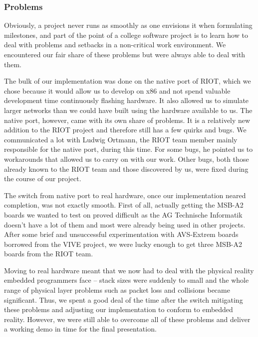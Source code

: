\documentclass[11pt,
  a4paper,
  ngerman,
  BCOR=7mm
]{scrartcl}
\begin{document}
\subsubsection*{Problems}
\label{ssub:problems}
Obviously, a project never runs as smoothly as one envisions it when
formulating milestones, and part of the point of a college software
project is to learn how to deal with problems and setbacks in
a non-critical work environment. We encountered our fair share of these
problems but were always able to deal with them.

The bulk of our implementation was done on the native port of RIOT,
which we chose because it would allow us to develop on x86 and not spend
valuable development time continuously flashing hardware. It also
allowed us to simulate larger networks than we could have built using
the hardware available to us. The native port, however, came with its
own share of problems. It is a relatively new addition to the RIOT
project and therefore still has a few quirks and bugs. We communicated
a lot with Ludwig Ortmann, the RIOT team member mainly responsible for
the native port, during this time. For some bugs, he pointed us to
workarounds that allowed us to carry on with our work. Other bugs, both
those already known to the RIOT team and those discovered by us, were
fixed during the course of our project.

The switch from native port to real hardware, once our implementation
neared completion, was not exactly smooth. First of all, actually
getting the MSB-A2 boards we wanted to test on proved difficult as the
AG Technische Informatik doesn't have a lot of them and most were
already being used in other projects. After some brief and unsuccessful
experimentation with AVS-Extrem boards borrowed from the VIVE project,
we were lucky enough to get three MSB-A2 boards from the RIOT team.

Moving to real hardware meant that we now had to deal with the physical
reality embedded programmers face -- stack sizes were suddenly to small
and the whole range of physical layer problems such as packet loss and
collisions became significant. Thus, we spent a good deal of the time
after the switch mitigating these problems and adjusting our
implementation to conform to embedded reality. However, we were still
able to overcome all of these problems and deliver a working demo in
time for the final presentation.
\end{document}
